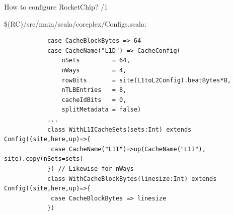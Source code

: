 \documentclass[]{beamer} %
\newenvironment{fullpage}[0]{%
	\begin{list}{}{%
		\setlength{\leftmargin}{-7mm}%
		\setlength{\rightmargin}{-7mm}%
		\vspace*{-10pt}
		}%
\item[]}{\end{list}}
\begin{document}
%
%

\begin{frame}[fragile]{How to configure RocketChip? /1}
	\begin{fullpage}
		\$(RC)/src/main/scala/coreplex/Configs.scala:
		\begin{verbatim}
			case CacheBlockBytes => 64
			case CacheName("L1D") => CacheConfig(
				nSets         = 64,
				nWays         = 4,
				rowBits       = site(L1toL2Config).beatBytes*8,
				nTLBEntries   = 8,
				cacheIdBits   = 0,
				splitMetadata = false)
			...
			class WithL1ICacheSets(sets:Int) extends Config((site,here,up)=>{
			 case CacheName("L1I")=>up(CacheName("L1I"), site).copy(nSets=sets)
			}) // Likewise for nWays
			class WithCacheBlockBytes(linesize:Int) extends Config((site,here,up)=>{
			 case CacheBlockBytes => linesize
			})
		\end{verbatim}
	\end{fullpage}
\end{frame}
\end{document}
